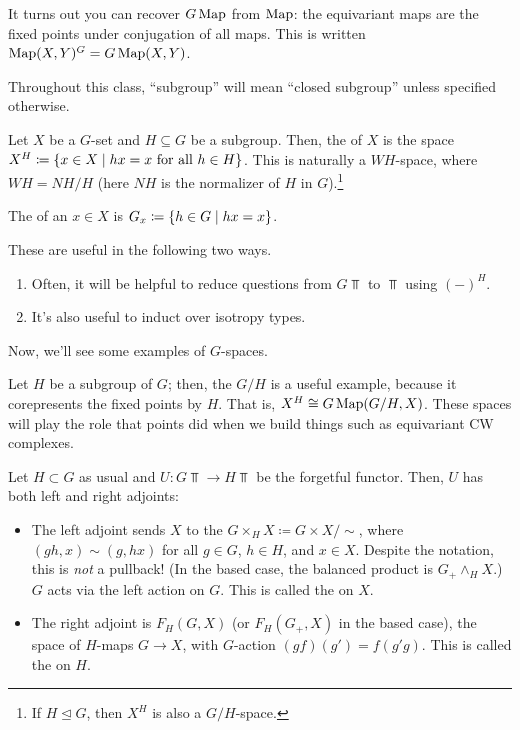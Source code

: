 It turns out you can recover $G\operatorname{Map}$ from $\operatorname{Map}$: the equivariant maps are the fixed points under conjugation of
all maps. This is written $\operatorname{Map}(X,Y)^G = G\operatorname{Map}(X,Y)$.

Throughout this class, ``subgroup'' will mean ``closed subgroup'' unless specified otherwise.
\begin{defn}
Let $X$ be a $G$-set and $H\subseteq G$ be a subgroup. Then, the  of $X$ is the space
$X^H\coloneqq \{x\in X\mid hx = x\text{ for all } h\in H\}$. This is naturally a $WH$-space, where $WH = NH/H$
(here $NH$ is the normalizer of $H$ in $G$).\footnote{If $H\trianglelefteq G$, then $X^H$ is also a
$G/H$-space.}
\end{defn}
\begin{defn}
The  of an $x\in X$ is $G_x\coloneqq \{h\in G\mid hx = x\}$.
\end{defn}
These are useful in the following two ways.
\begin{enumerate}
	\item Often, it will be helpful to reduce questions from $G\Top$ to $\Top$ using $(-)^H$.
	\item It's also useful to induct over isotropy types.
\end{enumerate}
Now, we'll see some examples of $G$-spaces.
\begin{exm}
Let $H$ be a subgroup of $G$; then, the  $G/H$ is a useful example, because it corepresents the
fixed points by $H$. That is, $X^H \cong G\operatorname{Map}(G/H, X)$. These spaces will play the role that points did when we
build things such as equivariant CW complexes.
\end{exm}
\begin{exm}
Let $H\subset G$ as usual and $U\colon G\Top\to H\Top$ be the forgetful functor. Then, $U$ has both left and right
adjoints:
\begin{itemize}
	\item The left adjoint sends $X$ to the  $G\times_H X\coloneqq G\times X/\sim$, where
	$(gh, x)\sim (g, hx)$ for all $g\in G$, $h\in H$, and $x\in X$. Despite the notation, this is \emph{not} a
	pullback! (In the based case, the balanced product is $G_+\wedge_H X$.) $G$ acts via the left action on $G$.
	This is called the  on $X$.
	\item The right adjoint is $F_H(G,X)$ (or $F_H(G_+, X)$ in the based case), the space of $H$-maps $G\to X$,
	with $G$-action $(gf)(g') = f(g'g)$. This is called the  on $H$.\qedhere
\end{itemize}
\end{exm}
